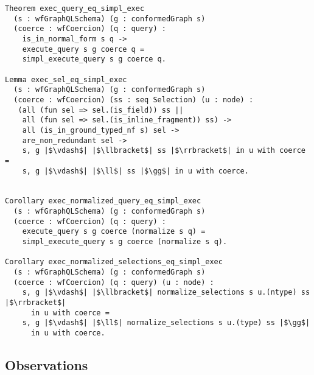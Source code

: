 \begin{verbatim}
Theorem exec_query_eq_simpl_exec 
  (s : wfGraphQLSchema) (g : conformedGraph s)
  (coerce : wfCoercion) (q : query) : 
    is_in_normal_form s q -> 
    execute_query s g coerce q =
    simpl_execute_query s g coerce q.
    
Lemma exec_sel_eq_simpl_exec
  (s : wfGraphQLSchema) (g : conformedGraph s) 
  (coerce : wfCoercion) (ss : seq Selection) (u : node) :
   (all (fun sel => sel.(is_field)) ss || 
    all (fun sel => sel.(is_inline_fragment)) ss) ->
    all (is_in_ground_typed_nf s) sel ->
    are_non_redundant sel -> 
    s, g |$\vdash$| |$\llbracket$| ss |$\rrbracket$| in u with coerce =
    s, g |$\vdash$| |$\ll$| ss |$\gg$| in u with coerce.
 
 
Corollary exec_normalized_query_eq_simpl_exec
  (s : wfGraphQLSchema) (g : conformedGraph s)
  (coerce : wfCoercion) (q : query) :
    execute_query s g coerce (normalize s q) =
    simpl_execute_query s g coerce (normalize s q).
    
Corollary exec_normalized_selections_eq_simpl_exec 
  (s : wfGraphQLSchema) (g : conformedGraph s)
  (coerce : wfCoercion) (q : query) (u : node) :
    s, g |$\vdash$| |$\llbracket$| normalize_selections s u.(ntype) ss |$\rrbracket$| 
      in u with coerce =
    s, g |$\vdash$| |$\ll$| normalize_selections s u.(type) ss |$\gg$| 
      in u with coerce.
\end{verbatim}



 
\subsection{Observations}\label{subsec:norm_lims}

